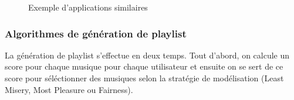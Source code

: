 \documentclass{article}
\begin{document}
		\begin{figure}[hb!]
			\centering
			\qquad
			\caption{Exemple d'applications similaires}%
			\label{fig:example_app}%
		\end{figure}
		
		\subsubsection{Algorithmes de génération de playlist}\label{algos}
		La génération de playlist s'effectue en deux temps. Tout d'abord, on calcule un score pour chaque musique pour chaque utilisateur et ensuite on se sert de ce score pour séléctionner des musiques selon la stratégie de modélisation (Least Misery, Most Pleasure ou Fairness).
		
\end{document}
